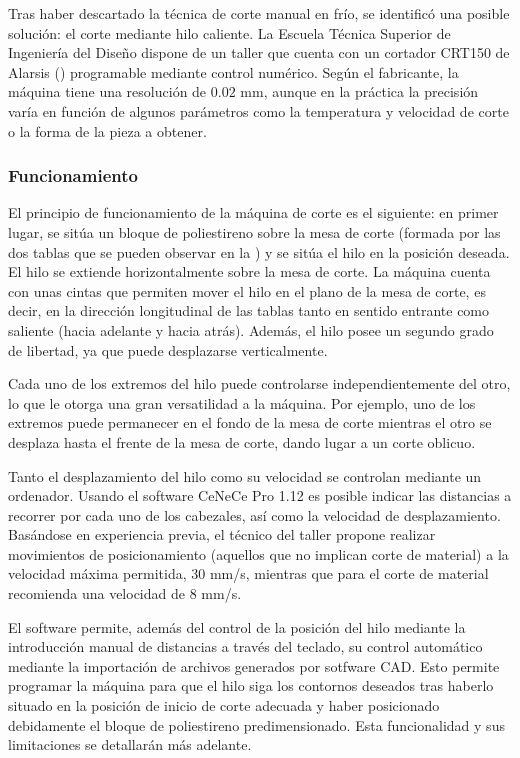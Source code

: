 Tras haber descartado la técnica de corte manual en frío, se identificó una posible solución: el corte mediante hilo caliente. La Escuela Técnica Superior de Ingeniería del Diseño dispone de un taller que cuenta con un cortador CRT150 de Alarsis () programable mediante control numérico. Según el fabricante\cite{ref:crt150}, la máquina tiene una resolución de $0.02$ mm, aunque en la práctica la precisión varía en función de algunos parámetros como la temperatura y velocidad de corte o la forma de la pieza a obtener.

\subsubsection{Funcionamiento}
\label{sec:building:technique:functioning}

El principio de funcionamiento de la máquina de corte es el siguiente: en primer lugar, se sitúa un bloque de poliestireno sobre la mesa de corte (formada por las dos tablas que se pueden observar en la ) y se sitúa el hilo en la posición deseada. El hilo se extiende horizontalmente sobre la mesa de corte. La máquina cuenta con unas cintas que permiten mover el hilo en el plano de la mesa de corte, es decir, en la dirección longitudinal de las tablas tanto en sentido entrante como saliente (hacia adelante y hacia atrás). Además, el hilo posee un segundo grado de libertad, ya que puede desplazarse verticalmente.

Cada uno de los extremos del hilo puede controlarse independientemente del otro, lo que le otorga una gran versatilidad a la máquina. Por ejemplo, uno de los extremos puede permanecer en el fondo de la mesa de corte mientras el otro se desplaza hasta el frente de la mesa de corte, dando lugar a un corte oblicuo.

Tanto el desplazamiento del hilo como su velocidad se controlan mediante un ordenador. Usando el software CeNeCe Pro 1.12 es posible indicar las distancias a recorrer por cada uno de los cabezales, así como la velocidad de desplazamiento. Basándose en experiencia previa, el técnico del taller propone realizar movimientos de posicionamiento (aquellos que no implican corte de material) a la velocidad máxima permitida, 30 mm/s, mientras que para el corte de material recomienda una velocidad de 8 mm/s.

El software permite, además del control de la posición del hilo mediante la introducción manual de distancias a través del teclado, su control automático mediante la importación de archivos generados por sotfware CAD. Esto permite programar la máquina para que el hilo siga los contornos deseados tras haberlo situado en la posición de inicio de corte adecuada y haber posicionado debidamente el bloque de poliestireno predimensionado. Esta funcionalidad y sus limitaciones se detallarán más adelante.

